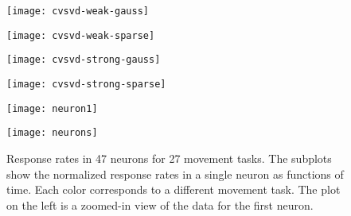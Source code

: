 \begin{figure}[tbh]
    \centering
    \begin{minipage}{0.49\textwidth}
        \begin{center}
            \texttt{[image: cvsvd-weak-gauss]}
        \end{center}
    \end{minipage}
    \begin{minipage}{0.49\textwidth}
        \begin{center}
            \texttt{[image: cvsvd-weak-sparse]}
        \end{center}
    \end{minipage}
    \caption{
    }
\end{figure}

\begin{figure}[htb]
    \centering
    \begin{minipage}{0.49\textwidth}
        \begin{center}
            \texttt{[image: cvsvd-strong-gauss]}
        \end{center}
    \end{minipage}
    \begin{minipage}{0.49\textwidth}
        \begin{center}
            \texttt{[image: cvsvd-strong-sparse]}
        \end{center}
    \end{minipage}
    \caption{
    }
\end{figure}


\clearpage

\begin{figure}[tbh]
    \centering
    \begin{minipage}{0.38\textwidth}
        \begin{center}
            \texttt{[image: neuron1]}
        \end{center}
    \end{minipage}
    \begin{minipage}{0.61\textwidth}
        \begin{center}
            \texttt{[image: neurons]}
        \end{center}
    \end{minipage}
    \caption{
        Response rates in 47 neurons for 27 movement tasks.  The subplots show
        the normalized response rates in a single neuron as functions of time.  
        Each color corresponds to a different movement task.  The plot on
        the left is a zoomed-in view of the data for the first neuron.
    }
\end{figure}

